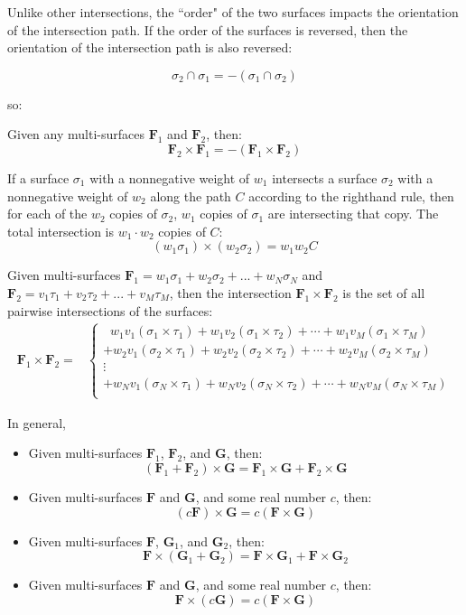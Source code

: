 Unlike other intersections, the ``order" of the two surfaces impacts the orientation of the intersection path. If the order of the surfaces is reversed, then the orientation of the intersection path is also reversed:

\[\sigma_2 \cap \sigma_1 = -(\sigma_1 \cap \sigma_2)\]

so:

\begin{thm}
Given any multi-surfaces \(\mathbf{F}_1\) and \(\mathbf{F}_2\), then:
\[\mathbf{F}_2 \times \mathbf{F}_1 = -(\mathbf{F}_1 \times \mathbf{F}_2)\]
\end{thm}

If a surface \(\sigma_1\) with a nonnegative weight of \(w_1\) intersects a surface \(\sigma_2\) with a nonnegative weight of \(w_2\) along the path \(C\) according to the righthand rule, then for each of the \(w_2\) copies of \(\sigma_2\), \(w_1\) copies of \(\sigma_1\) are intersecting that copy. The total intersection is \(w_1 \cdot w_2\) copies of \(C\):
\[(w_1 \sigma_1) \times (w_2 \sigma_2) = w_1 w_2 C\] 

Given multi-surfaces \(\mathbf{F}_1 = w_1\sigma_1 + w_2\sigma_2 + ... + w_N\sigma_N\) and \\ \(\mathbf{F}_2 = v_1\tau_1 + v_2\tau_2 + ... + v_M\tau_M\), then the intersection \(\mathbf{F}_1 \times \mathbf{F}_2\) is the set of all pairwise intersections of the surfaces:
\begin{align*}
\mathbf{F}_1 \times \mathbf{F}_2 = & \left\{\begin{array}{c}
\;\; w_1 v_1 (\sigma_1 \times \tau_1) + w_1 v_2 (\sigma_1 \times \tau_2) + \cdots + w_1 v_M (\sigma_1 \times \tau_M) \\ 
+ w_2 v_1 (\sigma_2 \times \tau_1) + w_2 v_2 (\sigma_2 \times \tau_2) + \cdots + w_2 v_M (\sigma_2 \times \tau_M) \\ 
\vdots \\
+ w_N v_1 (\sigma_N \times \tau_1) + w_N v_2 (\sigma_N \times \tau_2) + \cdots + w_N v_M (\sigma_N \times \tau_M) \\ 
\end{array}\right.
\end{align*}

In general,
\begin{itemize}
\item Given multi-surfaces \(\mathbf{F}_1\), \(\mathbf{F}_2\), and \(\mathbf{G}\), then:
\[(\mathbf{F}_1 + \mathbf{F}_2) \times \mathbf{G} = \mathbf{F}_1 \times \mathbf{G} + \mathbf{F}_2 \times \mathbf{G}\] 
\item Given multi-surfaces \(\mathbf{F}\) and \(\mathbf{G}\), and some real number \(c\), then:
\[(c\mathbf{F}) \times \mathbf{G} = c(\mathbf{F} \times \mathbf{G})\]
\item Given multi-surfaces \(\mathbf{F}\), \(\mathbf{G}_1\), and \(\mathbf{G}_2\), then:
\[\mathbf{F} \times (\mathbf{G}_1 + \mathbf{G}_2) = \mathbf{F} \times \mathbf{G}_1 + \mathbf{F} \times \mathbf{G}_2\] 
\item Given multi-surfaces \(\mathbf{F}\) and \(\mathbf{G}\), and some real number \(c\), then:
\[\mathbf{F} \times (c\mathbf{G}) = c(\mathbf{F} \times \mathbf{G})\]
\end{itemize}

